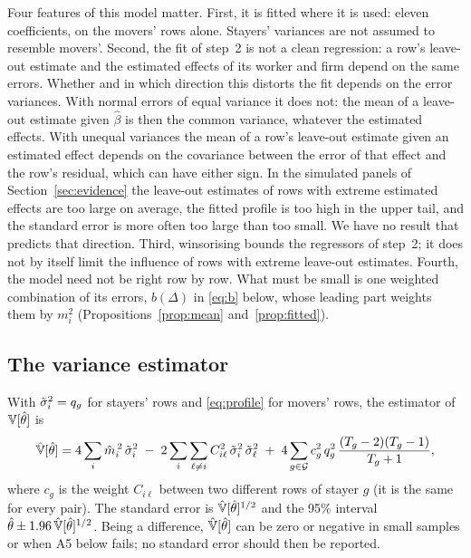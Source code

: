 Four features of this model matter. First, it is fitted where it is used: eleven coefficients, on the movers'
rows alone. Stayers' variances are not assumed to resemble movers'. Second, the fit of step~2 is not a clean
regression: a row's leave-out estimate and the estimated effects of its worker and firm depend on the same
errors. Whether and in which direction this distorts the fit depends on the error variances. With normal
errors of equal variance it does not: the mean of a leave-out estimate given $\hat\beta$ is then the common
variance, whatever the estimated effects. With unequal variances the mean of a
row's leave-out estimate given an estimated effect depends on the covariance between the error of that effect
and the row's residual, which can have either sign. In the simulated panels of Section~\ref{sec:evidence} the
leave-out estimates of rows with extreme estimated effects are too large on average, the fitted profile is
too high in the upper tail, and the standard error is more often too large than too small. We have no result that
predicts that direction. Third, winsorising bounds the regressors of step~2; it does not by itself limit the
influence of rows with extreme leave-out estimates. Fourth, the model need not be right row by row. What must be small is one
weighted combination of its errors, $b(\Delta)$ in \eqref{eq:b} below, whose leading part weights them by $m_i^2$
(Propositions~\ref{prop:mean} and~\ref{prop:fitted}).

\subsection{The variance estimator}

With $\tilde\sigma_i^2=q_g$ for stayers' rows and \eqref{eq:profile} for movers' rows, the estimator of
$\mathbb{V}[\hat\theta]$ is
\begin{equation}\label{eq:Vhat}
\hat{\mathbb{V}}[\hat\theta]=4\sum_i\hat m_i^{\,2}\,\tilde\sigma_i^2\;-\;2\sum_i\sum_{\ell\ne i}C_{i\ell}^2\,\tilde\sigma_i^2\,\tilde\sigma_\ell^2
\;+\;4\sum_{g\in\mathcal{G}}c_g^2\,q_g^2\,\frac{(T_g-2)(T_g-1)}{T_g+1},
\end{equation}
where $c_g$ is the weight $C_{i\ell}$ between two different rows of stayer $g$ (it is the same for every pair).
The standard error is $\hat{\mathbb{V}}[\hat\theta]^{1/2}$ and the 95\% interval
$\hat\theta\pm1.96\,\hat{\mathbb{V}}[\hat\theta]^{1/2}$. Being a difference, $\hat{\mathbb{V}}[\hat\theta]$ can be zero or negative in
small samples or when A5 below fails; no standard error should then be reported.

